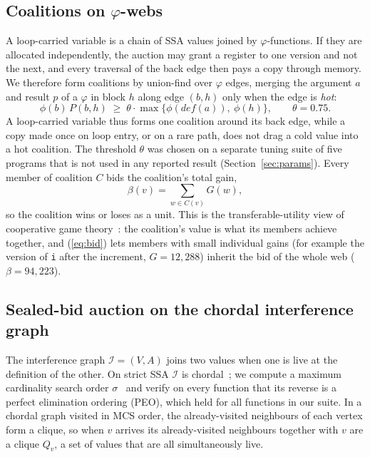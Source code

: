 \documentclass{ieeeaccess}
\newcommand{\tm}[1]{\texttt{#1}}
\begin{document}
\subsection{Coalitions on $\varphi$-webs}

A loop-carried variable is a chain of SSA values joined by
$\varphi$-functions. If they are allocated independently, the auction
may grant a register to one version and not the next, and every
traversal of the back edge then pays a copy through memory. We
therefore form coalitions by union-find over $\varphi$ edges, merging
the argument $a$ and result $p$ of a $\varphi$ in block $h$ along edge
$(b,h)$ only when the edge is \emph{hot}:
\begin{equation}
\phi(b)\,P(b,h) \;\ge\; \theta\cdot\max\big\{\phi(\mathit{def}(a)),\ \phi(h)\big\},
\qquad \theta=0.75 .
\label{eq:hot}
\end{equation}
A loop-carried variable thus forms one coalition around its back edge,
while a copy made once on loop entry, or on a rare path, does not drag
a cold value into a hot coalition. The threshold $\theta$ was chosen on
a separate tuning suite of five programs that is not used in any
reported result (Section~\ref{sec:params}). Every member of coalition $C$ bids the
coalition's total gain,
\begin{equation}
\beta(v)=\sum_{w\in C(v)} G(w),
\label{eq:bid}
\end{equation}
so the coalition wins or loses as a unit. This is the transferable-utility
view of cooperative game theory~\cite{shapley1953}: the coalition's
value is what its members achieve together, and (\ref{eq:bid}) lets
members with small individual gains (for example the version of
\tm{i} after the increment, $G=12{,}288$) inherit the bid of the whole
web ($\beta=94{,}223$).

\subsection{Sealed-bid auction on the chordal interference graph}

The interference graph $\mathcal{I}=(V,A)$ joins two values when one is
live at the definition of the other. On strict SSA $\mathcal{I}$ is
chordal~\cite{hack2006ssa}; we compute a maximum cardinality search
order $\sigma$~\cite{tarjan1984} and verify on every function that its
reverse is a perfect elimination ordering (PEO), which held for all
functions in our suite. In a chordal graph visited in MCS order, the
already-visited neighbours of each vertex form a clique, so when $v$
arrives its already-visited neighbours together with $v$ are a clique
$Q_v$, a set of values that are all simultaneously live.
\end{document}

